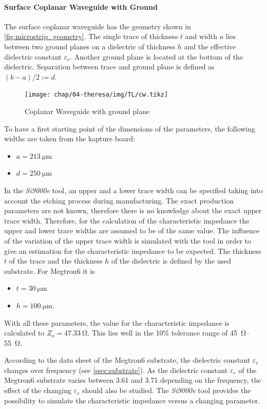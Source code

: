 \clearpage
\paragraph{Surface Coplanar Waveguide with Ground}
The surface coplanar waveguide has the geometry shown in \autoref{fig:microstrip_geometry}.
The single trace of thickness $t$ and width $a$ lies between two ground planes on a dielectric of thickness $h$ and the effective dielectric constant $\varepsilon_r$.
Another ground plane is located at the bottom of the dielectric.
Separation between trace and ground plane is defined as $(b-a)/2 := d$. 

\begin{figure}[H]
	\centering
	\texttt{[image: chap/04-theresa/img/TL/cw.tikz]}
	\caption{Coplanar Waveguide with ground plane}
	\label{fig:microstrip_geometry}
\end{figure}

To have a first starting point of the dimensions of the parameters, the following widths are taken from the \gls{kapture} board:
\begin{itemize}
	\item $a = \SI{213}{\micro \meter}$
	\item $d = \SI{250}{\micro \meter}$
\end{itemize}
In the \textit{Si9000e} tool, an upper and a lower trace width can be specified taking into account the etching process during manufacturing.
The exact production parameters are not known, therefore there is no knowledge about the exact upper trace width.
Therefore, for the calculation of the characteristic impedance the upper and lower trace widths are assumed to be of the same value.
The influence of the variation of the upper trace width is simulated with the tool in order to give an estimation for the characteristic impedance to be expected.
The thickness $t$ of the trace and the thickness $h$ of the dielectric is defined by the used substrate.
For Megtron6 it is 
\begin{itemize}
	\item $t = \SI{30}{\micro \meter}$
	\item $h = \SI{100}{\micro \meter}$.
\end{itemize}
With all these parameters, the value for the characteristic impedance is calculated to $Z_o = \SI{47.33}{\ohm}$.
This lies well in the 10\% tolerance range of \SIrange{45}{55}{\ohm}. 

According to the data sheet of the Megtron6 substrate, the dielectric constant $\varepsilon_r$ changes over frequency (see \autoref{ssec:substrate}).
As the dielectric constant $\varepsilon_r$ of the Megtron6 substrate varies between 3.61 and 3.71 depending on the frequency, the effect of the changing $\varepsilon_r$ should also be studied. 
The \textit{Si9000e} tool provides the possibility to simulate the characteristic impedance versus a changing parameter.

